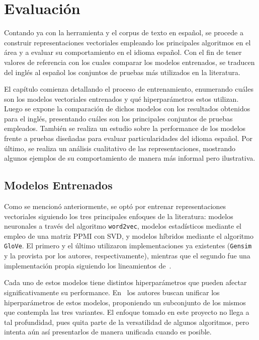 \chapter{Evaluación}

Contando ya con la herramienta y el corpus de texto en español, se procede a construir
representaciones vectoriales empleando los principales algoritmos en el área y a evaluar su
comportamiento en el idioma español. Con el fin de tener valores de referencia con los cuales
comparar los modelos entrenados, se traducen del inglés al español los conjuntos de pruebas más
utilizados en la literatura.

El capítulo comienza detallando el proceso de entrenamiento, enumerando cuáles son los modelos
vectoriales entrenados y qué hiperparámetros estos utilizan. Luego se expone la comparación de
dichos modelos con los resultados obtenidos para el inglés, presentando cuáles son los principales
conjuntos de pruebas empleados. También se realiza un estudio sobre la performance de los modelos
frente a pruebas diseñadas para evaluar particularidades del idioma español. Por último, se realiza
un análisis cualitativo de las representaciones, mostrando algunos ejemplos de su comportamiento de
manera más informal pero ilustrativa.


\section{Modelos Entrenados}

Como se mencionó anteriormente, se optó por entrenar representaciones vectoriales siguiendo los tres
principales enfoques de la literatura: modelos neuronales a través del algoritmo \texttt{word2vec},
modelos estadísticos mediante el empleo de una matriz PPMI con SVD, y modelos híbridos mediante el
algoritmo \texttt{GloVe}. El primero y el último utilizaron implementaciones ya existentes
(\texttt{Gensim} y la provista por los autores, respectivamente), mientras que el segundo fue una
implementación propia siguiendo los lineamientos de~\cite{Levy2015}.

Cada uno de estos modelos tiene distintos hiperparámetros que pueden afectar significativamente su
performance. En~\cite{Levy2015} los autores buscan unificar los hiperparámetros de estos modelos,
proponiendo un subconjunto de los mismos que contempla las tres variantes. El enfoque tomado en este
proyecto no llega a tal profundidad, pues quita parte de la versatilidad de algunos algoritmos, pero
intenta aún así presentarlos de manera unificada cuando es posible.


